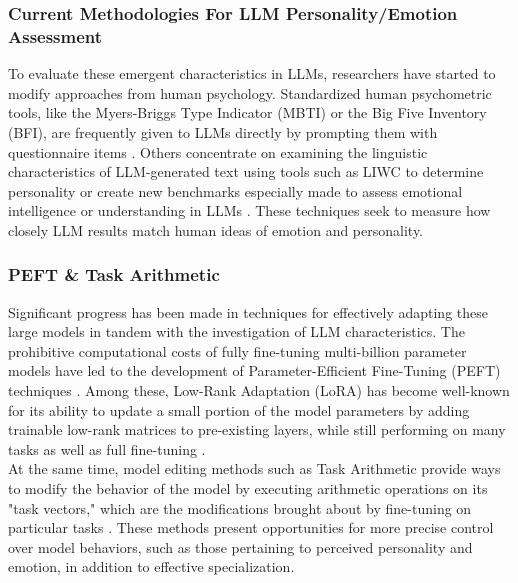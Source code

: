 \documentclass{DESSThesis}
\begin{document}
\subsubsection{Current Methodologies For LLM Personality/Emotion Assessment}
To evaluate these emergent characteristics in LLMs, researchers have started to modify approaches from human psychology. Standardized human psychometric tools, like the Myers-Briggs Type Indicator (MBTI) or the Big Five Inventory (BFI), are frequently given to LLMs directly by prompting them with questionnaire items \cite{caron_identifying_2022,pan_llms_2023,sorokovikova_llms_2024}. Others concentrate on examining the linguistic characteristics of LLM-generated text using tools such as LIWC to determine personality \cite{jiang_personallm_2024,hilliard_eliciting_2024} or create new benchmarks especially made to assess emotional intelligence or understanding in LLMs \cite{paech_eq-bench_2024,wang_emotional_2023,sabour_emobench_2024}. These techniques seek to measure how closely LLM results match human ideas of emotion and personality.

\subsubsection{PEFT \& Task Arithmetic}
Significant progress has been made in techniques for effectively adapting these large models in tandem with the investigation of LLM characteristics. The prohibitive computational costs of fully fine-tuning multi-billion parameter models have led to the development of Parameter-Efficient Fine-Tuning (PEFT) techniques \cite{houlsby_parameter-efficient_2019,lialin_scaling_2023}. Among these, Low-Rank Adaptation (LoRA) has become well-known for its ability to update a small portion of the model parameters by adding trainable low-rank matrices to pre-existing layers, while still performing on many tasks as well as full fine-tuning \cite{hu_lora_2021,mao_survey_2025}.
\\
At the same time, model editing methods such as Task Arithmetic provide ways to modify the behavior of the model by executing arithmetic operations on its "task vectors," which are the modifications brought about by fine-tuning on particular tasks \cite{ilharco_editing_2023,chronopoulou_language_2023}. These methods present opportunities for more precise control over model behaviors, such as those pertaining to perceived personality and emotion, in addition to effective specialization.
\end{document}
